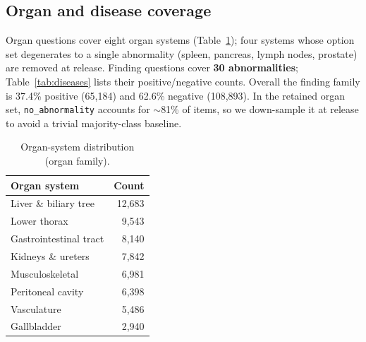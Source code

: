 \subsection{Organ and disease coverage}
Organ questions cover eight organ systems (Table~\ref{tab:organs}); four systems
whose option set degenerates to a single abnormality (spleen, pancreas, lymph
nodes, prostate) are removed at release. Finding questions cover \textbf{30
abnormalities}; Table~\ref{tab:diseases} lists their positive/negative counts.
Overall the finding family is 37.4\% positive (65{,}184) and 62.6\% negative
(108{,}893). In the retained organ set, \texttt{no\_abnormality} accounts for
$\sim$81\% of items, so we down-sample it at release to avoid a trivial
majority-class baseline.

\begin{table}[t]
\centering
\caption{Organ-system distribution (organ family).}
\label{tab:organs}
\begin{tabular}{lr}
\toprule
Organ system & Count \\
\midrule
Liver \& biliary tree      & 12{,}683 \\
Lower thorax               & 9{,}543 \\
Gastrointestinal tract     & 8{,}140 \\
Kidneys \& ureters         & 7{,}842 \\
Musculoskeletal            & 6{,}981 \\
Peritoneal cavity          & 6{,}398 \\
Vasculature                & 5{,}486 \\
Gallbladder                & 2{,}940 \\
\bottomrule
\end{tabular}
\end{table}

